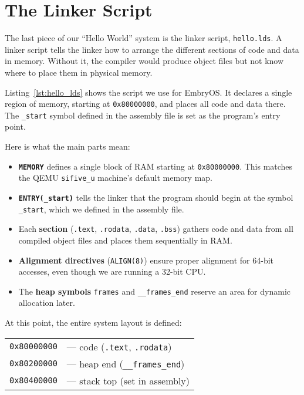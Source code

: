 \section{The Linker Script}

The last piece of our ``Hello World'' system is the linker script,
\texttt{hello.lds}.  A linker script tells the linker how to arrange the
different sections of code and data in memory.  Without it, the compiler would
produce object files but not know where to place them in physical memory.

Listing~\ref{lst:hello_lds} shows the script we use for EmbryOS.  It declares a
single region of memory, starting at \texttt{0x80000000}, and places all code
and data there.  The \texttt{\_start} symbol defined in the assembly file is set
as the program’s entry point.

\begin{figure}[H]
\centering
\begin{minipage}{0.95\textwidth}

\end{minipage}
\end{figure}

Here is what the main parts mean:

\begin{itemize}
  \item \textbf{\texttt{MEMORY}} defines a single block of RAM starting at
        \texttt{0x80000000}.  This matches the QEMU \texttt{sifive\_u} machine’s
        default memory map.
  \item \textbf{\texttt{ENTRY(\_start)}} tells the linker that the program should
        begin at the symbol \texttt{\_start}, which we defined in the assembly
        file.
  \item Each \textbf{section} (\texttt{.text}, \texttt{.rodata},
        \texttt{.data}, \texttt{.bss}) gathers code and data from all compiled
        object files and places them sequentially in RAM.
  \item \textbf{Alignment directives} (\texttt{ALIGN(8)}) ensure proper
        alignment for 64-bit accesses, even though we are running a 32-bit CPU.
  \item The \textbf{heap symbols} \texttt{frames} and
        \texttt{\_\_frames\_end} reserve an area for dynamic allocation later.
\end{itemize}

At this point, the entire system layout is defined:
\begin{center}
\begin{tabular}{ll}
\texttt{0x80000000} & --- code (\texttt{.text}, \texttt{.rodata}) \\
\texttt{0x80200000} & --- heap end (\texttt{\_\_frames\_end}) \\
\texttt{0x80400000} & --- stack top (set in assembly)
\end{tabular}
\end{center}


